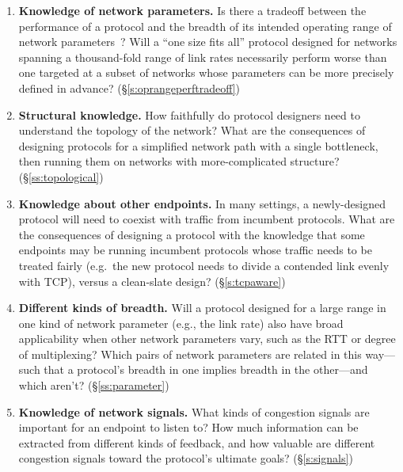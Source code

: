 \begin{enumerate}

\item \textbf{Knowledge of network parameters.} Is there a tradeoff
  between the performance of a protocol and the breadth of its
  intended operating range of network parameters~\cite{wroclawski}?
  Will a ``one size fits all'' protocol designed for networks spanning
  a thousand-fold range of link rates necessarily perform worse than
  one targeted at a subset of networks whose parameters can be more
  precisely defined in advance?  (\S\ref{s:oprangeperftradeoff})

\item \textbf{Structural knowledge.} How faithfully do protocol
  designers need to understand the topology of the network? What are
  the consequences of designing protocols for a simplified network
  path with a single bottleneck, then running them on networks with
  more-complicated structure?  (\S\ref{ss:topological})

\item \textbf{Knowledge about other endpoints.} In many settings, a
  newly-designed protocol will need to coexist with traffic from
  incumbent protocols. What are the consequences of designing a
  protocol with the knowledge that some endpoints may be running
  incumbent protocols whose traffic needs to be treated fairly
  (e.g.~the new protocol needs to divide a contended link evenly with
  TCP), versus a clean-slate design?  (\S\ref{s:tcpaware})

\item \textbf{Different kinds of breadth.} Will a protocol designed
  for a large range in one kind of network parameter (e.g., the link
  rate) also have broad applicability when other network parameters
  vary, such as the RTT or degree of multiplexing?  Which pairs of
  network parameters are related in this way---such that a protocol's
  breadth in one implies breadth in the other---and which aren't?
  (\S\ref{ss:parameter})

\item \textbf{Knowledge of network signals.} What kinds of congestion
  signals are important for an endpoint to listen to? How much
  information can be extracted from different kinds of feedback, and
  how valuable are different congestion signals toward the protocol's
  ultimate goals?  (\S\ref{s:signals})

\end{enumerate}


